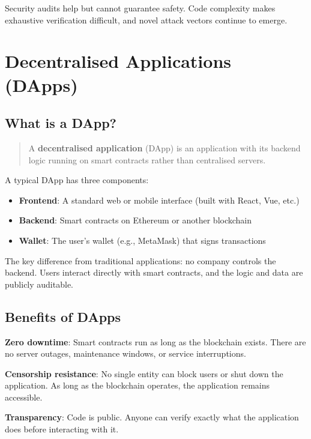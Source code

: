 \documentclass[11pt,a4paper]{article}
\newcommand{\keyword}[1]{\textbf{\textcolor{AccentOrange}{#1}}}
\begin{document}
Security audits help but cannot guarantee safety. Code complexity makes exhaustive verification difficult, and novel attack vectors continue to emerge.

\section{Decentralised Applications (DApps)}

\subsection{What is a DApp?}

\begin{quote}
A \keyword{decentralised application} (DApp) is an application with its backend logic running on smart contracts rather than centralised servers.
\end{quote}

A typical DApp has three components:
\begin{itemize}
    \item \textbf{Frontend}: A standard web or mobile interface (built with React, Vue, etc.)
    \item \textbf{Backend}: Smart contracts on Ethereum or another blockchain
    \item \textbf{Wallet}: The user's wallet (e.g., MetaMask) that signs transactions
\end{itemize}

The key difference from traditional applications: no company controls the backend. Users interact directly with smart contracts, and the logic and data are publicly auditable.

\subsection{Benefits of DApps}

\textbf{Zero downtime}: Smart contracts run as long as the blockchain exists. There are no server outages, maintenance windows, or service interruptions.

\textbf{Censorship resistance}: No single entity can block users or shut down the application. As long as the blockchain operates, the application remains accessible.

\textbf{Transparency}: Code is public. Anyone can verify exactly what the application does before interacting with it.
\end{document}
